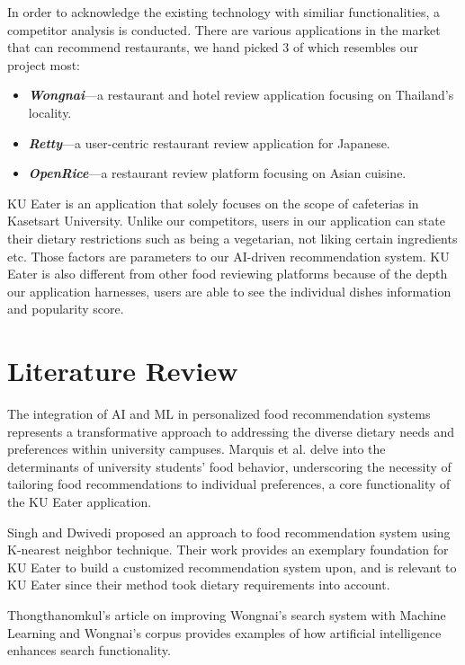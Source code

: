In order to acknowledge the existing technology with similiar functionalities, a competitor analysis is conducted.
There are various applications in the market that can recommend restaurants, we hand picked 3 of which resembles our project most:

\begin{itemize}
    \item \textbf{\textit{Wongnai}}---a restaurant and hotel review application focusing on Thailand's locality.
    \item \textbf{\textit{Retty}}---a user-centric restaurant review application for Japanese.
    \item \textbf{\textit{OpenRice}}---a restaurant review platform focusing on Asian cuisine.
\end{itemize}

\par
KU Eater is an application that solely focuses on the scope of cafeterias in Kasetsart University.
Unlike our competitors, users in our application can state their dietary restrictions such as being a vegetarian,
not liking certain ingredients etc. Those factors are parameters to our AI-driven recommendation system.
KU Eater is also different from other food reviewing platforms because of the depth our application harnesses,
users are able to see the individual dishes information and popularity score.

\section{Literature Review}
\label{section:literature-review}

The integration of AI and ML in personalized food recommendation systems represents a transformative approach to addressing
the diverse dietary needs and preferences within university campuses. Marquis et al. \cite{marquisetal:2018}
delve into the determinants of university students' food behavior, underscoring the necessity of tailoring
food recommendations to individual preferences, a core functionality of the KU Eater application.

Singh and Dwivedi \cite{singhanddwivedi:2023} proposed an approach to food recommendation system using K-nearest neighbor technique.
Their work provides an exemplary foundation for KU Eater to build a customized recommendation system upon,
and is relevant to KU Eater since their method took dietary requirements into account.

Thongthanomkul's \cite{thongthanomkul:2020} article on improving Wongnai's search system with Machine Learning
and Wongnai's \cite{wongnaicorpus:github} corpus provides examples of how artificial intelligence enhances search functionality.

